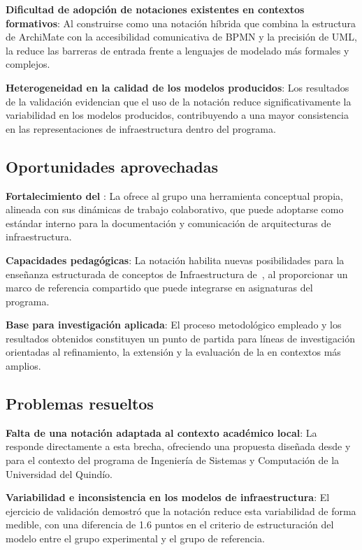 \textbf{Dificultad de adopción de notaciones existentes en contextos formativos}: Al construirse como una notación híbrida que combina la estructura de ArchiMate con la accesibilidad comunicativa de BPMN y la precisión de UML, la \NDITI reduce las barreras de entrada frente a lenguajes de modelado más formales y complejos.

\textbf{Heterogeneidad en la calidad de los modelos producidos}: Los resultados de la validación evidencian que el uso de la notación reduce significativamente la variabilidad en los modelos producidos, contribuyendo a una mayor consistencia en las representaciones de infraestructura dentro del programa.

\subsection{Oportunidades aprovechadas}
\noindent

\textbf{Fortalecimiento del \GRID}: La \NDITI ofrece al grupo una herramienta conceptual propia, alineada con sus dinámicas de trabajo colaborativo, que puede adoptarse como estándar interno para la documentación y comunicación de arquitecturas de infraestructura.

\textbf{Capacidades pedagógicas}: La notación habilita nuevas posibilidades para la enseñanza estructurada de conceptos de Infraestructura de~\TI, al proporcionar un marco de referencia compartido que puede integrarse en asignaturas del programa.

\textbf{Base para investigación aplicada}: El proceso metodológico empleado y los resultados obtenidos constituyen un punto de partida para líneas de investigación orientadas al refinamiento, la extensión y la evaluación de la \NDITI en contextos más amplios.

\subsection{Problemas resueltos}
\noindent

\textbf{Falta de una notación adaptada al contexto académico local}: La \NDITI responde directamente a esta brecha, ofreciendo una propuesta diseñada desde y para el contexto del programa de Ingeniería de Sistemas y Computación de la Universidad del Quindío.

\textbf{Variabilidad e inconsistencia en los modelos de infraestructura}: El ejercicio de validación demostró que la notación reduce esta variabilidad de forma medible, con una diferencia de 1.6 puntos en el criterio de estructuración del modelo entre el grupo experimental y el grupo de referencia.

